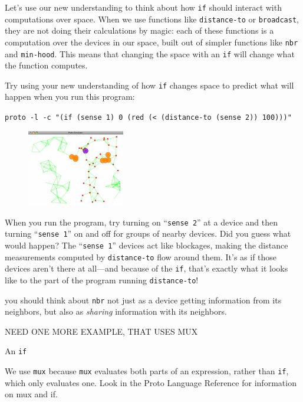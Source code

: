 \documentclass{article}
\newcommand\code[1]{\begin{center}\var{#1}\end{center}}
\newcommand\var[1]{{\tt #1}}
\newcommand\qvar[1]{``{\tt #1}''}
\begin{document}
Let's use our new understanding to think about how \var{if} should
interact with computations over space.  When we use functions like
\var{distance-to} or \var{broadcast}, they are not doing their
calculations by magic: each of these functions is a computation over
the devices in our space, built out of simpler functions like
\var{nbr} and \var{min-hood}.  This means that changing the space with
an \var{if} will change what the function computes.

Try using your new understanding of how \var{if} changes space
to predict what will happen when you run this program:

\code{proto -l -c "(if (sense 1) 0 (red (< (distance-to (sense 2)) 100)))"}

\begin{figure}
  \vspace{-0.8cm}
  \includegraphics[width=0.38\textwidth]{figures/blocked-distance.png}
  \caption{}
  \vspace{-0.5cm}
  \label{f:blockdist}
\end{figure}

When you run the program, try turning on \qvar{sense 2} at a device
and then turning \qvar{sense 1} on and off for groups of nearby
devices.  Did you guess what would happen?  The \qvar{sense 1} devices
act like blockages, making the distance measurements computed by
\var{distance-to} flow around them.  It's as if those devices aren't
there at all---and because of the \var{if}, that's exactly what
it looks like to the part of the program running \var{distance-to}!

you should think about \var{nbr} not just as a device getting
information from its neighbors, but also as {\em sharing} information
with its neighbors.

NEED ONE MORE EXAMPLE, THAT USES MUX

An \var{if}

\label{s:mux}
We use \var{mux} because \var{mux} evaluates both
parts of an expression, rather than \var{if}, which only evaluates
one.  Look in the Proto Language Reference for information on mux and
if.
\TODO{}
\end{document}

